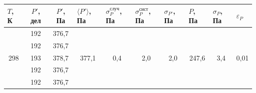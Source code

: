 \documentclass[a4paper,12pt]{article}
\begin{document}
\begin{table}[H]
\begin{tabular}{|c|c|c|c|c|c|c|c|c|c|}
\hline
\multicolumn{1}{|l|}{$ T $, К} & $ P' $, дел & $ P' $, Па & \multicolumn{1}{l|}{$ \langle P' \rangle $, Па} & \multicolumn{1}{l|}{$\sigma_P^{случ}$, Па} & \multicolumn{1}{l|}{$\sigma_P^{сист}$, Па} & \multicolumn{1}{l|}{$ \sigma_{P'} $, Па} & \multicolumn{1}{l|}{$ P $, Па} & \multicolumn{1}{l|}{$ \sigma_P $, Па} & \multicolumn{1}{l|}{$\varepsilon_P$} \\ \hline
\multirow{5}{*}{298}           & 192         & 376,7      & \multirow{5}{*}{377,1}                          & \multirow{5}{*}{0,4}                       & \multirow{5}{*}{2,0}                       & \multirow{5}{*}{2,0}                     & \multirow{5}{*}{247,6}         & \multirow{5}{*}{3,4}                  & \multirow{5}{*}{0,01}                \\ \cline{2-3}
                               & 192         & 376,7      &                                                 &                                            &                                            &                                          &                                &                                       &                                      \\ \cline{2-3}
                               & 193         & 378,7      &                                                 &                                            &                                            &                                          &                                &                                       &                                      \\ \cline{2-3}
                               & 192         & 376,7      &                                                 &                                            &                                            &                                          &                                &                                       &                                      \\ \cline{2-3}
                               & 192         & 376,7      &                                                 &                                            &                                            &                                          &                                &                                       &                                      \\ \hline
\end{tabular}
\end{table}
\end{document}
